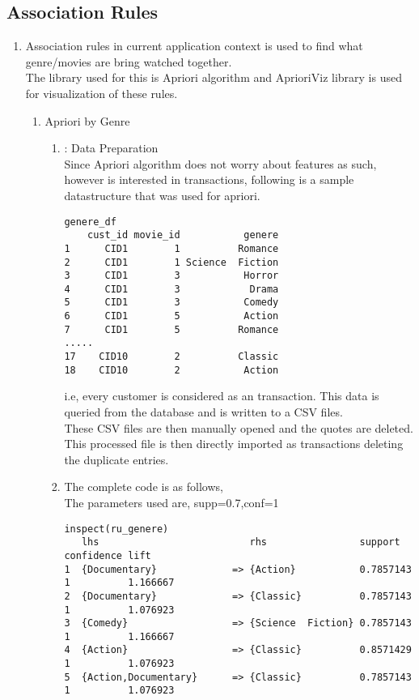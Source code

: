 \documentclass{article}
\begin{document}
\subsection*{Association Rules}
\begin{enumerate}
\item Association rules in current application context is used to find what genre/movies are bring watched together.\\ The library used for this is Apriori algorithm and AprioriViz library is used for visualization of these rules.
\begin{enumerate}
\item Apriori by Genre
\begin{enumerate}
\item: Data Preparation \\
Since Apriori algorithm does not worry about features as such, however is interested in transactions, following is a sample datastructure that was used for apriori.
\begin{verbatim}
genere_df
    cust_id movie_id           genere
1      CID1        1          Romance
2      CID1        1 Science  Fiction
3      CID1        3           Horror
4      CID1        3            Drama
5      CID1        3           Comedy
6      CID1        5           Action
7      CID1        5          Romance
.....
17    CID10        2          Classic
18    CID10        2           Action
\end{verbatim}
i.e, every customer is considered as an transaction. This data is queried from the database and is written to a CSV files.\\
These CSV files are then manually opened and the quotes are deleted. This processed file is then directly imported as transactions deleting the duplicate entries.\\
\item The complete code is as follows,\\
The parameters used are, supp=0.7,conf=1

\begin{verbatim}
inspect(ru_genere)
   lhs                          rhs                support   confidence lift    
1  {Documentary}             => {Action}           0.7857143 1          1.166667
2  {Documentary}             => {Classic}          0.7857143 1          1.076923
3  {Comedy}                  => {Science  Fiction} 0.7857143 1          1.166667
4  {Action}                  => {Classic}          0.8571429 1          1.076923
5  {Action,Documentary}      => {Classic}          0.7857143 1          1.076923

\end{verbatim}
\end{enumerate}
\end{enumerate}
\end{enumerate}
\end{document}
